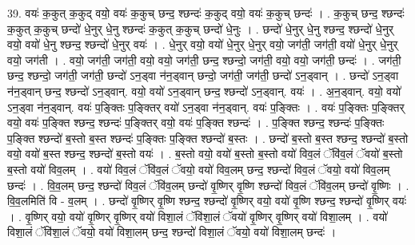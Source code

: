 \documentclass[17pt]{extarticle}
\begin{document}
39. वयः॑ क॒कुत् क॒कुद् वयो॒ वयः॑ क॒कुच् छन्द॒ श्छन्दः॑ क॒कुद् वयो॒ वयः॑ क॒कुच् छन्दः॑ । . क॒कुच् छन्द॒ श्छन्दः॑ क॒कुत् क॒कुच् छन्दो॑ धे॒नुर् धे॒नु श्छन्दः॑ क॒कुत् क॒कुच् छन्दो॑ धे॒नुः । . छन्दो॑ धे॒नुर् धे॒नु श्छन्द॒ श्छन्दो॑ धे॒नुर् वयो॒ वयो॑ धे॒नु श्छन्द॒ श्छन्दो॑ धे॒नुर् वयः॑ । . धे॒नुर् वयो॒ वयो॑ धे॒नुर् धे॒नुर् वयो॒ जग॑ती॒ जग॑ती॒ वयो॑ धे॒नुर् धे॒नुर् वयो॒ जग॑ती । . वयो॒ जग॑ती॒ जग॑ती॒ वयो॒ वयो॒ जग॑ती॒ छन्द॒ श्छन्दो॒ जग॑ती॒ वयो॒ वयो॒ जग॑ती॒ छन्दः॑ । . जग॑ती॒ छन्द॒ श्छन्दो॒ जग॑ती॒ जग॑ती॒ छन्दो॑ ऽन॒ड्वा न॑न॒ड्वान् छन्दो॒ जग॑ती॒ जग॑ती॒ छन्दो॑ ऽन॒ड्वान् । . छन्दो॑ ऽन॒ड्वा न॑न॒ड्वान् छन्द॒ श्छन्दो॑ ऽन॒ड्वान्. वयो॒ वयो॑ ऽन॒ड्वान् छन्द॒ श्छन्दो॑ ऽन॒ड्वान्. वयः॑ । . अ॒न॒ड्वान्. वयो॒ वयो॑ ऽन॒ड्वा न॑न॒ड्वान्. वयः॑ प॒ङ्क्तिः प॒ङ्क्तिर् वयो॑ ऽन॒ड्वा न॑न॒ड्वान्. वयः॑ प॒ङ्क्तिः । . वयः॑ प॒ङ्क्तिः प॒ङ्क्तिर् वयो॒ वयः॑ प॒ङ्क्ति श्छन्द॒ श्छन्दः॑ प॒ङ्क्तिर् वयो॒ वयः॑ प॒ङ्क्ति श्छन्दः॑ । . प॒ङ्क्ति श्छन्द॒ श्छन्दः॑ प॒ङ्क्तिः प॒ङ्क्ति श्छन्दो॑ ब॒स्तो ब॒स्त श्छन्दः॑ प॒ङ्क्तिः प॒ङ्क्ति श्छन्दो॑ ब॒स्तः । . छन्दो॑ ब॒स्तो ब॒स्त श्छन्द॒ श्छन्दो॑ ब॒स्तो वयो॒ वयो॑ ब॒स्त श्छन्द॒ श्छन्दो॑ ब॒स्तो वयः॑ । . ब॒स्तो वयो॒ वयो॑ ब॒स्तो ब॒स्तो वयो॑ विव॒लं ॅवि॑व॒लं ॅवयो॑ ब॒स्तो ब॒स्तो वयो॑ विव॒लम् । . वयो॑ विव॒लं ॅवि॑व॒लं ॅवयो॒ वयो॑ विव॒लम् छन्द॒ श्छन्दो॑ विव॒लं ॅवयो॒ वयो॑ विव॒लम् छन्दः॑ । . वि॒व॒लम् छन्द॒ श्छन्दो॑ विव॒लं ॅवि॑व॒लम् छन्दो॑ वृ॒ष्णिर् वृ॒ष्णि श्छन्दो॑ विव॒लं ॅवि॑व॒लम् छन्दो॑ वृ॒ष्णिः । . वि॒व॒लमिति॑ वि - व॒लम् । . छन्दो॑ वृ॒ष्णिर् वृ॒ष्णि श्छन्द॒ श्छन्दो॑ वृ॒ष्णिर् वयो॒ वयो॑ वृ॒ष्णि श्छन्द॒ श्छन्दो॑ वृ॒ष्णिर् वयः॑ । . वृ॒ष्णिर् वयो॒ वयो॑ वृ॒ष्णिर् वृ॒ष्णिर् वयो॑ विशा॒लं ॅवि॑शा॒लं ॅवयो॑ वृ॒ष्णिर् वृ॒ष्णिर् वयो॑ विशा॒लम् । . वयो॑ विशा॒लं ॅवि॑शा॒लं ॅवयो॒ वयो॑ विशा॒लम् छन्द॒ श्छन्दो॑ विशा॒लं ॅवयो॒ वयो॑ विशा॒लम् छन्दः॑ । \newline
\end{document}
